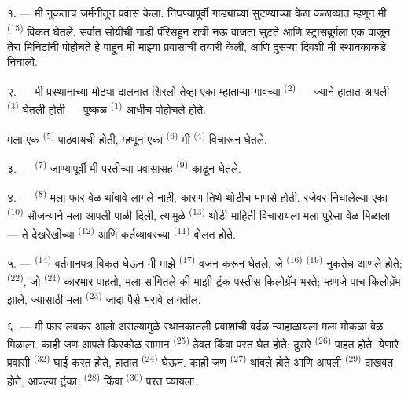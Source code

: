 १. --- मी नुकताच जर्मनीतून प्रवास केला. निघण्यापूर्वी गाड्यांच्या सुटण्याच्या वेळा कळाव्यात
म्हणून मी  \textsuperscript{(15)} विकत घेतले. सर्वात सोयीची गाडी
पॅरिसहून रात्री नऊ वाजता सुटते आणि स्ट्रासबूर्गला एक वाजून तेरा मिनिटांनी पोहोचते हे पाहून मी
माझ्या प्रवासाची तयारी केली, आणि दुसऱ्या दिवशी मी स्थानकाकडे निघालो.

२. --- मी प्रस्थानाच्या मोठ्या दालनात शिरलो तेव्हा एका म्हाताऱ्या गावच्या
 \textsuperscript{(2)} — ज्याने हातात आपली 
\textsuperscript{(3)} घेतली होती — पुष्कळ  \textsuperscript{(1)} आधीच पोहोचले
होते.

मला एक  \textsuperscript{(5)} पाठवायची होती, म्हणून एका 
\textsuperscript{(6)} मी  \textsuperscript{(4)} विचारून घेतले.

३. ---  \textsuperscript{(7)} जाण्यापूर्वी मी परतीच्या प्रवासासह
 \textsuperscript{(9)} काढून घेतले.

४. ---  \textsuperscript{(8)} मला फार वेळ थांबावे लागले नाही, कारण तिथे थोडीच
माणसे होती. रजेवर निघालेल्या एका  \textsuperscript{(10)} सौजन्याने मला आपली
पाळी दिली, त्यामुळे  \textsuperscript{(13)} थोडी माहिती विचारायला
मला पुरेसा वेळ मिळाला — ते देखरेखीच्या  \textsuperscript{(12)} आणि
कर्तव्यावरच्या  \textsuperscript{(11)} बोलत होते.

\VUsaut{3.0mm}

५. ---  \textsuperscript{(14)} वर्तमानपत्र विकत घेऊन मी माझे
 \textsuperscript{(17)} वजन करून घेतले, जे 
\textsuperscript{(16)}  \textsuperscript{(19)} नुकतेच आणले होते;
 \textsuperscript{(22)}, जो  \textsuperscript{(21)}
कारभार पाहतो, मला सांगितले की माझी ट्रंक पस्तीस किलोग्रॅम भरते; म्हणजे पाच किलोग्रॅम
 झाले, ज्यासाठी मला  \textsuperscript{(23)}
जादा पैसे भरावे लागतील.

६. --- मी फार लवकर आलो असल्यामुळे स्थानकातली प्रवाशांची वर्दळ न्याहाळायला मला मोकळा वेळ
मिळाला. काही जण आपले किरकोळ सामान  \textsuperscript{(25)} ठेवत
किंवा परत घेत होते; दुसरे  \textsuperscript{(26)} पाहत होते. येणारे प्रवासी
 \textsuperscript{(32)} घाई करत होते, हातात 
\textsuperscript{(24)} घेऊन. काही जण  \textsuperscript{(27)}
थांबले होते आणि आपली  \textsuperscript{(29)} दाखवत होते, आपल्या ट्रंका,
 \textsuperscript{(28)} किंवा  \textsuperscript{(30)} परत
घ्यायला.

